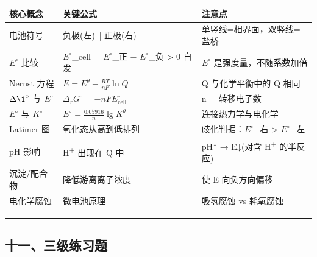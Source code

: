 \documentclass[a4paper,11pt]{ctexart}
\newcounter{none}
\begin{document}
{\def\LTcaptype{none} %
\begin{longtable}[]{@{}
  >{\raggedright\arraybackslash}p{}
  >{\raggedright\arraybackslash}p{}
  >{\raggedright\arraybackslash}p{}@{}}
\toprule\noalign{}
\begin{minipage}[b]{\linewidth}\raggedright
核心概念
\end{minipage} & \begin{minipage}[b]{\linewidth}\raggedright
关键公式
\end{minipage} & \begin{minipage}[b]{\linewidth}\raggedright
注意点
\end{minipage} \\
\midrule\noalign{}
\endhead
\bottomrule\noalign{}
\endlastfoot
电池符号 & 负极(左) ‖ 正极(右) & 单竖线=相界面，双竖线=盐桥 \\
\(E^{\circ}\) 比较 & \(E^{\circ}\)\_cell = \(E^{\circ}\)\_正 − \(E^{\circ}\)\_负 \textgreater{} 0 自发 & \(E^{\circ}\) 是强度量，不随系数加倍 \\
Nernst 方程 & \(E = E^\theta - \frac{RT}{nF}\ln Q\) & Q 与化学平衡中的 Q 相同 \\
\(\Delta \1^{\circ}\) 与 \(E^{\circ}\) & \(\Delta_rG^\circ = -nFE^\circ_{\text{cell}}\) & n = 转移电子数 \\
\(E^{\circ}\) 与 \(K^{\circ}\) & \(E^\circ = \frac{0.05916}{n}\lg K^\theta\) & 连接热力学与电化学 \\
Latimer 图 & 氧化态从高到低排列 & 歧化判据：\(E^{\circ}\)\_右 \textgreater{} \(E^{\circ}\)\_左 \\
pH 影响 & H\textsuperscript{+} 出现在 Q 中 & pH↑ → E↓(对含 H\textsuperscript{+} 的半反应) \\
沉淀/配合物 & 降低游离离子浓度 & 使 E 向负方向偏移 \\
电化学腐蚀 & 微电池原理 & 吸氢腐蚀 vs 耗氧腐蚀 \\
\end{longtable}
}

\begin{center}\rule{0.5\linewidth}{0.5pt}\end{center}

\subsection{十一、三级练习题}\label{ux5341ux4e00ux4e09ux7ea7ux7ec3ux4e60ux9898}
\end{document}
